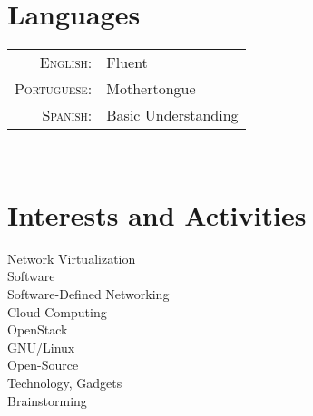 \documentclass[letter,10pt]{article} %
\begin{document}

\section{Languages}

\begin{tabular}{rl}
	\textsc{English:} & Fluent\\
	
	\textsc{Portuguese:} & Mothertongue\\
	
	\textsc{Spanish:} & Basic Understanding\\
\end{tabular} \\


\section{Interests and Activities}
Network Virtualization\\
Software\\
Software-Defined Networking\\
Cloud Computing\\
OpenStack\\
GNU/Linux\\
Open-Source\\
Technology, Gadgets\\
Brainstorming\\

\end{document}
